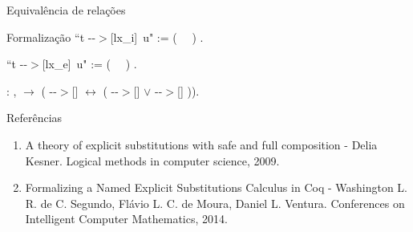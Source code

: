 \documentclass{beamer}
\begin{document}
\begin{frame}{Equivalência de relações}
    \begin{block}{Formalização}
    \coqdocnoindent {} ``t -{}-$>$[lx\_i]\ u" :=
    (\ \ 
    ) .

    \bigskip

    \coqdocnoindent {} ``t -{}-$>$[lx\_e]\ u" :=
    (\ \ 
    ) .  \coqdoceol

    \bigskip

     :
    \coqdockw{\ensuremath{\forall}}  ,
      \ensuremath{\rightarrow} (
    -{}-$>$[]  \ensuremath{\leftrightarrow} (
    -{}-$>$[]  \ensuremath{\lor} 
    -{}-$>$[] )).\coqdoceol

    \end{block}
\end{frame}



\begin{frame}{Referências}
\begin{enumerate}
\item A theory of explicit substitutions with safe and full composition - Delia Kesner. Logical methods in computer science, 2009.
\item Formalizing a Named Explicit Substitutions Calculus in Coq - Washington L. R. de C. Segundo, Flávio L. C. de Moura, Daniel L. Ventura. Conferences on Intelligent Computer Mathematics, 2014.
\end{enumerate}
\end{frame}
\end{document}
